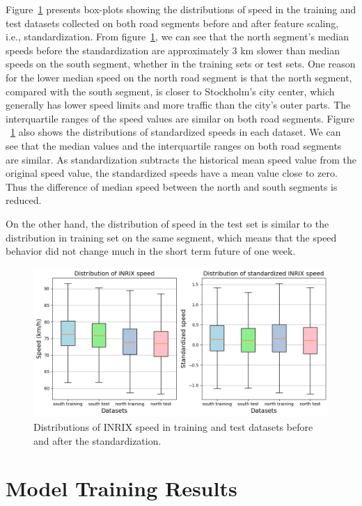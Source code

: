 \documentclass[english]{kththesis}
\begin{document}
Figure~\ref{fig:standardization_boxplots} presents box-plots showing the distributions of speed in the training and test datasets collected on both road segments before and after feature scaling, i.e., standardization. From figure~\ref{fig:standardization_boxplots}, we can see that the north segment's median speeds before the standardization are approximately 3 km slower than median speeds on the south segment, whether in the training sets or test sets. One reason for the lower median speed on the north road segment is that the north segment, compared with the south segment, is closer to Stockholm's city center, which generally has lower speed limits and more traffic than the city's outer parts. The interquartile ranges of the speed values are similar on both road segments. Figure ~\ref{fig:standardization_boxplots} also shows the distributions of standardized speeds in each dataset. We can see that the median values and the interquartile ranges on both road segments are similar. As standardization subtracts the historical mean speed value from the original speed value, the standardized speeds have a mean value close to zero. Thus the difference of median speed between the north and south segments is reduced. 

On the other hand, the distribution of speed in the test set is similar to the distribution in training set on the same segment, which means that the speed behavior did not change much in the short term future of one week.

\begin{figure}[!ht]
    \centering
    \includegraphics[width=\textwidth]{standardization_boxplots.png}
    \caption{Distributions of INRIX speed in training and test datasets before and after the standardization.}
    \label{fig:standardization_boxplots}
\end{figure}

\section{Model Training Results}
\label{sec:modelTrainingResults}
\end{document}
